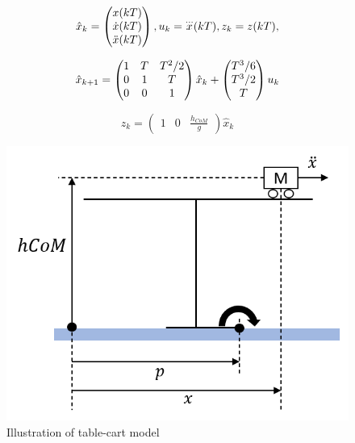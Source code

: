 \begin{equation}
  \hat{x}_{k}=
  \begin{pmatrix}
    x(kT)\cr \dot{x}(kT)\cr\ddot{x}(kT)
  \end{pmatrix}
  ,
  u_{k}
    =
    {\buildrel\ldots\over{x}}(kT)
    , z_{k}=z(kT),
\end{equation}

\begin{equation}
  \hat{x}_{k+1}=
  \begin{pmatrix}
    1&T&T^{2}/2\cr 0&1&T\cr 0&0&1
  \end{pmatrix}
  \hat{x}_{k} +
  \begin{pmatrix}
    T^{3}/6 \\  T^{3}/2 \\ T
  \end{pmatrix}
  u_{k}
\end{equation}

\begin{equation}
  z_{k} =
  \begin{pmatrix}
   1 & 0 & \frac{h_{CoM}}{g}
  \end{pmatrix}
  \hat{x}_{k}
\end{equation}

\begin{figure}[hbtp]
  \centering
  \includegraphics[keepaspectratio, scale=0.6]
  {images/table_cart_hcom.png}
  \caption{Illustration of table-cart model }
  \label{Fig:tablecart}
\end{figure}



